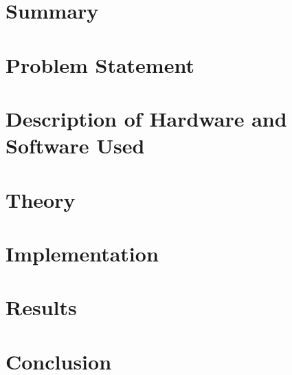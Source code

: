 \documentclass[12pt, twoside,a4paper]{report}
\begin{document}


\chapter{Summary}


\chapter{Problem Statement}
 

\chapter{Description of Hardware and Software Used}


\chapter*{Theory}


\chapter{Implementation}


\chapter{Results}


\chapter{Conclusion}


%


\end{document}
